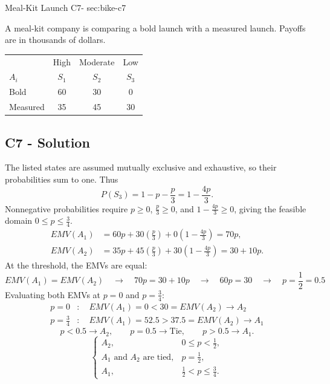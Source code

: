 \sectionScored
	{Meal-Kit Launch}
	{C7-}
	{sec:bike-c7}
	{
	A meal-kit company is comparing a bold launch with a measured launch. Payoffs are in thousands of dollars.
		\begin{center}\setlength{\tabcolsep}{2pt}\renewcommand{\arraystretch}{1.1}
			\begin{tabular}{lccc}\toprule
				&High&Moderate&Low\\ 				
				$A_i$&$S_1$&$S_2$&$S_3$\\ 
				\midrule
				Bold&60&30&0\\
				Measured&35&45&30\\ \bottomrule
			\end{tabular}
		\end{center}


	\label{subsec:bike-c7-solution}
	\subsection*{C7 - Solution }

	The listed states are assumed mutually exclusive and exhaustive, so their probabilities sum to one. Thus
		\[
		P(S_3)=1-p-\frac{p}{3}=1-\frac{4p}{3}.
		\]
		Nonnegative probabilities require $p\ge0$, $\frac{p}{3}\ge0$, and $1-\frac{4p}{3}\ge0$, giving the feasible domain $0\le p\le\frac{3}{4}$.
		\begin{align*}
EMV(A_1)&=60p+30\left(\frac{p}{3}\right)+0\left(1-\frac{4p}{3}\right)=70p,\\
			EMV(A_2)&=35p+45\left(\frac{p}{3}\right)+30\left(1-\frac{4p}{3}\right)=30+10p.
		\end{align*}
		At the threshold, the EMVs are equal:
		\[
		EMV(A_1) = EMV(A_2)
		\quad \longrightarrow \quad
		70p=30+10p
		\quad \longrightarrow \quad
		60p=30
		\quad \longrightarrow \quad
		p=\frac{1}{2}=0.5
		\]
		Evaluating both EMVs at $p=0$ and $p=\frac{3}{4}$:
		\[
		\begin{aligned}
			p=0 &: \quad
			EMV(A_1)=0 < 30=EMV(A_2)
			\longrightarrow A_2\\
			p=\frac{3}{4} &: \quad
			EMV(A_1)=52.5 > 37.5=EMV(A_2)
			\longrightarrow A_1
		\end{aligned}
		\]
		\[
		p<0.5 \longrightarrow A_2,\qquad
		p=0.5 \longrightarrow \text{Tie},\qquad
		p>0.5 \longrightarrow A_1.
		\]
		\[
		\boxed{\begin{cases}
				A_2,&0\le p<\frac{1}{2},\\
				A_1\text{ and }A_2\text{ are tied},&p=\frac{1}{2},\\
				A_1,&\frac{1}{2}<p\le\frac{3}{4}.
		\end{cases}}
		\]

	}

